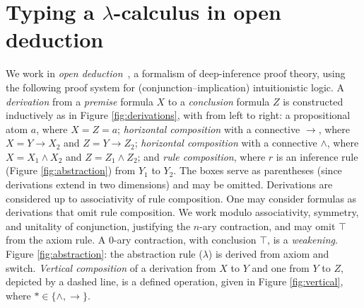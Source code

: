 \documentclass[a4paper,UKenglish,cleveref, autoref]{lipics-v2019}
\newcommand{\set}[1]{ \{ #1 \} }
\begin{document}
\section{Typing a $\lambda$-calculus in open deduction}

\label{sec:typingacalculus}

We work in \emph{open deduction}~\cite{Guglielmi-Gundersen-Parigot-2010}, a formalism of deep-inference proof theory, using the following proof system for (conjunction--implication) intuitionistic logic. A \emph{derivation} from a \emph{premise} formula $X$ to a \emph{conclusion} formula $Z$ is constructed inductively as in Figure \ref{fig:derivations}, with from left to right: a propositional atom $a$, where $X = Z = a$; \emph{horizontal composition} with a connective $\rightarrow$, where $X = Y \rightarrow X_{2}$ and $Z = Y \rightarrow Z_{2}$; \emph{horizontal composition} with a connective $\wedge$, where $X = X_{1} \wedge X_{2}$ and $Z = Z_{1} \wedge Z_{2}$; and \emph{rule composition}, where $r$ is an inference rule (Figure \ref{fig:abstraction}) from $Y_{1}$ to $Y_{2}$. The boxes serve as parentheses (since derivations extend in two dimensions) and may be omitted. Derivations are considered up to associativity of rule composition. One may consider formulas as derivations that omit rule composition. We work modulo associativity, symmetry, and unitality of conjunction, justifying the $n$-ary contraction, and may omit $\top$ from the axiom rule. A $0$-ary contraction, with conclusion $\top$, is a \emph{weakening}. Figure \ref{fig:abstraction}: the abstraction rule ($\lambda$) is derived from axiom and switch. \emph{Vertical composition} of a derivation from $X$ to $Y$ and one from $Y$ to $Z$, depicted by a dashed line, is a defined operation, given in Figure \ref{fig:vertical}, where $* \in \set{\wedge, \rightarrow}$.
\end{document}
